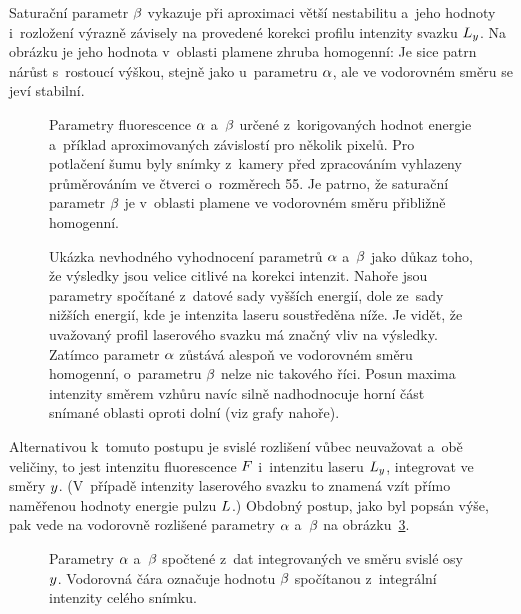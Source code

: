Saturační parametr $\beta$ vykazuje při aproximaci větší nestabilitu
a~jeho hodnoty i~rozložení výrazně závisely na provedené korekci profilu
intenzity svazku $L_y$.
Na obrázku je jeho hodnota v~oblasti plamene zhruba homogenní:
Je sice patrn nárůst s~rostoucí výškou, stejně jako u~parametru $\alpha$,
ale ve vodorovném směru se jeví stabilní.

\begin{figure}
	\centering
	\small
	
	\caption{Parametry fluorescence $\alpha$ a~$\beta$
		určené z~korigovaných hodnot energie
		a~příklad aproximovaných závislostí pro několik pixelů.
		Pro potlačení šumu byly snímky z~kamery před zpracováním vyhlazeny
		průměrováním ve čtverci o~rozměrech \num{5}\times\SI{5}{\pixel}.
		Je patrno, že saturační parametr $\beta$ je
		v~oblasti plamene ve vodorovném směru přibližně homogenní.}
	\label{fig:lif-saturation-full-params}
\end{figure}

\begin{figure}[htp]
	\centering
	\small
	
	\caption{Ukázka nevhodného vyhodnocení parametrů $\alpha$ a~$\beta$
		jako důkaz toho, že výsledky jsou velice citlivé na korekci intenzit.
		Nahoře jsou parametry spočítané z~datové sady vyšších energií,
		dole ze~sady nižších energií, kde je intenzita laseru soustředěna níže.
		Je vidět, že uvažovaný profil laserového svazku má značný vliv
		na výsledky.
		Zatímco parametr $\alpha$ zůstává alespoň ve vodorovném směru
		homogenní, o~parametru $\beta$ nelze nic takového říci.
		Posun maxima intenzity směrem vzhůru navíc silně nadhodnocuje
		horní část snímané oblasti oproti dolní (viz grafy nahoře).}
	\label{fig:saturation-full-params-bad}
\end{figure}

Alternativou k~tomuto postupu je svislé rozlišení vůbec neuvažovat
a~obě veličiny, to jest intenzitu fluorescence $F$ i~intenzitu
laseru $L_y$, integrovat ve směry $y$.
(V~případě intenzity laserového svazku to znamená vzít přímo
naměřenou hodnoty energie pulzu $L$.)
Obdobný postup, jako byl popsán výše, pak vede na vodorovně rozlišené
parametry $\alpha$ a~$\beta$ na obrázku~\ref{fig:lif-saturation-x-params}.

\begin{figure}[htp]
	\centering
	
	\caption{Parametry $\alpha$ a~$\beta$ spočtené z~dat integrovaných
		ve směru svislé osy $y$.
		Vodorovná čára označuje hodnotu $\beta$ spočítanou z~integrální
		intenzity celého snímku.}
	\label{fig:lif-saturation-x-params}
\end{figure}

